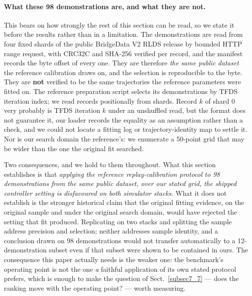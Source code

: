 \documentclass[pdflatex,iicol,sn-apa]{sn-jnl}
\theoremstyle{remark}
\begin{document}
\paragraph{What these 98 demonstrations are, and what they are not.}
This bears on how strongly the rest of this section can be read, so we state it before the results
rather than in a limitation. The demonstrations are read from four fixed shards of the public
BridgeData V2 RLDS release by bounded HTTP range request, with CRC32C and SHA-256 verified per
record, and the manifest records the byte offset of every one. They are therefore \emph{the same
public dataset} the reference calibration draws on, and the selection is reproducible to the byte.
They are \textbf{not} verified to be the same trajectories the reference parameters were fitted on.
The reference preparation script selects its demonstrations by TFDS iteration index; we read records
positionally from shards. Record $k$ of shard 0 very probably is TFDS iteration $k$ under an
unshuffled read, but the format does not guarantee it, our loader records the equality as an
assumption rather than a check, and we could not locate a fitting log or trajectory-identity map to
settle it. Nor is our search domain the reference's: we enumerate a 50-point grid that may be wider
than the one the original fit searched.

Two consequences, and we hold to them throughout. What this section establishes is that
\emph{applying the reference replay-calibration protocol to 98 demonstrations from the same public
dataset, over our stated grid, the shipped controller setting is disfavoured on both simulator
stacks.} What it does not establish is the stronger historical claim that the original fitting
evidence, on the original sample and under the original search domain, would have rejected the
setting that fit produced. Replicating on two stacks and splitting the sample address precision and
selection; neither addresses sample identity, and a conclusion drawn on 98 demonstrations would not
transfer automatically to a 12-demonstration subset even if that subset were shown to be contained
in ours. The consequence this paper actually needs is the weaker one: the benchmark's operating point
is not the one \emph{a} faithful application of its own stated protocol prefers, which is enough to
make the question of Sect.~\ref{subsec7_7} --- does the ranking move with the operating point? ---
worth measuring.
\end{document}
